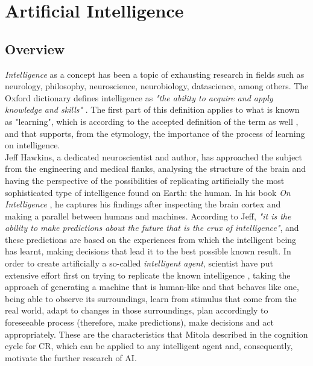 \acresetall
\chapter{Artificial Intelligence}\label{ch:ml_intro}

\section{Overview}
\emph{Intelligence} as a concept has been a topic of exhausting research in fields such as neurology, philosophy, neuroscience, neurobiology, datascience, among others. The Oxford dictionary defines intelligence as \emph{"the ability to acquire and apply knowledge and skills"} \cite{Oxforda}. The first part of this definition applies to what is known as "learning", which is according to the accepted definition of the term as well \cite{Oxford}, and that supports, from the etymology, the importance of the process of learning on intelligence.\\

Jeff Hawkins, a dedicated neuroscientist and author, has approached the subject from the engineering and medical flanks, analysing the structure of the brain and having the perspective of the possibilities of replicating artificially the most sophisticated type of intelligence found on Earth: the human. In his book \emph{On Intelligence} \cite{HawkinsJeff2004}, he captures his findings after inspecting the brain cortex and making a parallel between humans and machines. According to Jeff, \emph{"it is the ability to make predictions about the future that is the crux of intelligence"}, and these predictions are based on the experiences from which the intelligent being has learnt, making decisions that lead it to the best possible known result. In order to create artificially a so-called \emph{intelligent agent}, scientist have put extensive effort first on trying to replicate the known intelligence \cite{Brooks1991}\cite{Reed2007}\cite{Hawkins}, taking the approach of generating a machine that is human-like and that behaves like one, being able to observe its surroundings, learn from stimulus that come from the real world, adapt to changes in those surroundings, plan accordingly to foreseeable process (therefore, make predictions), make decisions and act appropriately. These are the characteristics that Mitola \cite{Mitola1999} described in the cognition cycle for \ac{CR}, which can be applied to any intelligent agent and, consequently, motivate the further research of \ac{AI}.\\

